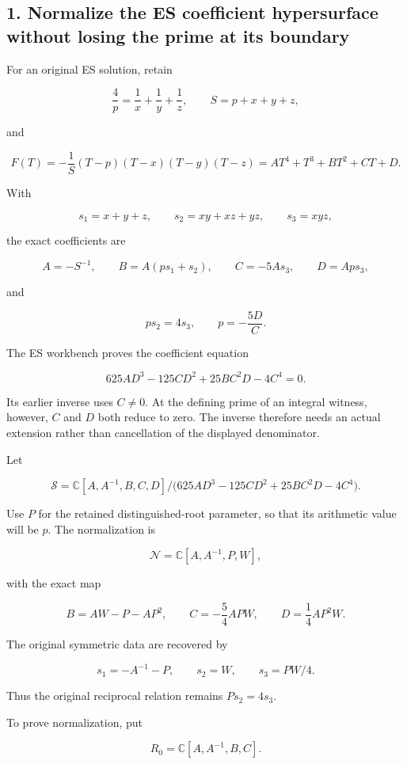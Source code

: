 \subsection{1. Normalize the ES coefficient hypersurface without losing
the prime at its
boundary}\label{normalize-the-es-coefficient-hypersurface-without-losing-the-prime-at-its-boundary}

For an original ES solution, retain

\[
\frac4p=\frac1x+\frac1y+\frac1z,
\qquad
S=p+x+y+z,
\]

and

\[
F(T)=-\frac1S(T-p)(T-x)(T-y)(T-z)
=AT^4+T^3+BT^2+CT+D.
\]

With

\[
s_1=x+y+z,\qquad s_2=xy+xz+yz,\qquad s_3=xyz,
\]

the exact coefficients are

\[
A=-S^{-1},\qquad
B=A(ps_1+s_2),\qquad
C=-5As_3,\qquad
D=Aps_3,
\]

and

\[
ps_2=4s_3,\qquad p=-\frac{5D}{C}.
\]

The ES workbench proves the coefficient equation

\[
625AD^3-125CD^2+25BC^2D-4C^4=0.
\tag{3}
\]

Its earlier inverse uses \(C\ne0\). At the defining prime of an integral
witness, however, \(C\) and \(D\) both reduce to zero. The inverse
therefore needs an actual extension rather than cancellation of the
displayed denominator.

Let

\[
\mathscr S=
\mathbb C[A,A^{-1},B,C,D]\Big/
\bigl(625AD^3-125CD^2+25BC^2D-4C^4\bigr).
\]

Use \(P\) for the retained distinguished-root parameter, so that its
arithmetic value will be \(p\). The normalization is

\[
\boxed{
\mathscr N=\mathbb C[A,A^{-1},P,W],
}
\]

with the exact map

\[
\boxed{
B=AW-P-AP^2,\qquad
C=-\frac54APW,\qquad
D=\frac14AP^2W.
}
\tag{4}
\]

The original symmetric data are recovered by

\[
s_1=-A^{-1}-P,\qquad s_2=W,\qquad s_3=PW/4.
\]

Thus the original reciprocal relation remains \(Ps_2=4s_3\).

To prove normalization, put

\[
R_0=\mathbb C[A,A^{-1},B,C].
\]

